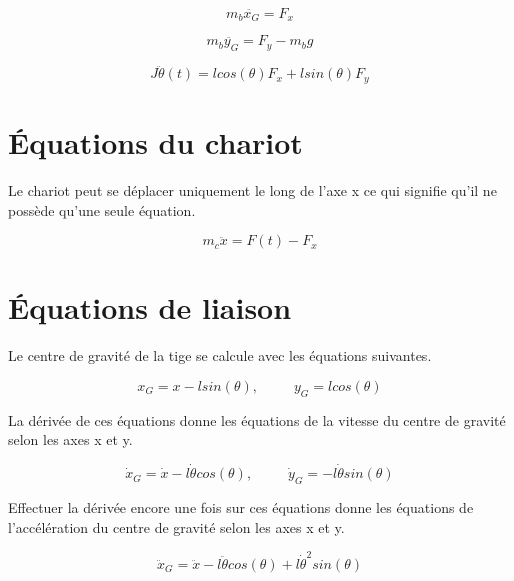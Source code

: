 \begin{equation}\label{eq:SecondNewtX}
  m_b\ddot{x_G} = F_x
\end{equation}

\begin{equation}\label{eq:SecondNewtY}
  m_b\ddot{y_G} = F_y - m_bg
\end{equation}

\begin{equation}\label{eq:SecondNewtMom}
  J\ddot{\theta}(t) = lcos(\theta)F_x + lsin(\theta)F_y
\end{equation}

\section{Équations du chariot}\label{sec:EqChar}
Le chariot peut se déplacer uniquement le long de l'axe x ce qui signifie qu'il ne possède qu'une seule équation.

\begin{equation}\label{eq:SecondNewtX2}
  m_c\ddot{x} = F(t) - F_x
\end{equation}

\section{Équations de liaison}\label{sec:EqLiaison}
Le centre de gravité de la tige se calcule avec les équations suivantes.

\begin{equation*}
  x_G = x - lsin(\theta), \hspace{30pt} y_G = lcos(\theta)
\end{equation*}

La dérivée de ces équations donne les équations de la vitesse du centre de gravité selon les axes x et y.

\begin{equation*}
  \dot{x}_G = \dot{x} - l\dot{\theta}cos(\theta), \hspace{30pt} \dot{y}_G = -l\dot{\theta}sin(\theta)
\end{equation*}

Effectuer la dérivée encore une fois sur ces équations donne les équations de l'accélération du centre de gravité selon les axes x et y.

\begin{equation}\label{eq:SecondNewtXG}
  \ddot{x}_G = \ddot{x} - l\ddot{\theta}cos(\theta) + l\dot{\theta}^2sin(\theta)
\end{equation}

